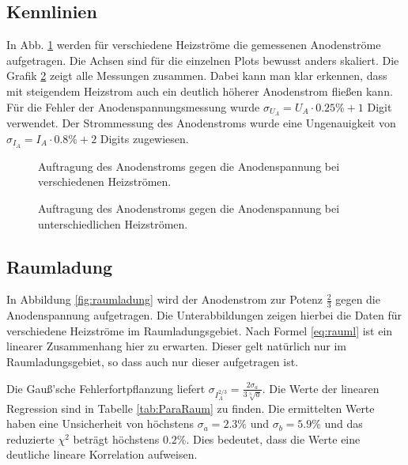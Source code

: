 \documentclass[12pt,a4paper,titlepage,headinclude,bibtotoc]{scrartcl}
\begin{document}
\subsection{Kennlinien}
In Abb. \ref{fig:heiz} werden für verschiedene Heizströme die gemessenen Anodenströme aufgetragen.
Die Achsen sind für die einzelnen Plots bewusst anders skaliert.
Die Grafik \ref{fig:h} zeigt alle Messungen zusammen.
Dabei kann man klar erkennen, dass mit steigendem Heizstrom auch ein deutlich höherer Anodenstrom fließen kann.
Für die Fehler der Anodenspannungsmessung wurde $\sigma_{U_A}=U_A\cdot 0.25\%+1$ Digit verwendet.
Der Strommessung des Anodenstroms wurde eine Ungenauigkeit von $\sigma_{I_A}= I_A\cdot 0.8\%+2$ Digits zugewiesen.
\begin{figure}[h]
  \centering
  \hfill
  \hfill
  \caption{Auftragung des Anodenstroms gegen die Anodenspannung bei verschiedenen Heizströmen.}
  \label{fig:heiz}
\end{figure}
\begin{figure}[!h]
	\centering
	
	\caption{Auftragung des Anodenstroms gegen die Anodenspannung bei unterschiedlichen Heizströmen.}
	\label{fig:h}
\end{figure}


\subsection{Raumladung}
In Abbildung \ref{fig:raumladung} wird der Anodenstrom zur Potenz $\frac{2}{3}$ gegen die Anodenspannung aufgetragen.
Die Unterabbildungen zeigen hierbei die Daten für verschiedene Heizströme im Raumladungsgebiet.
Nach Formel \eqref{eq:rauml} ist ein linearer Zusammenhang hier zu erwarten.
Dieser gelt natürlich nur im Raumladungsgebiet, so dass auch nur dieser aufgetragen ist.

Die Gauß'sche Fehlerfortpflanzung liefert $\sigma_{I_A^{2/3}}=\frac{2\sigma_{a}}{3\sqrt[3]{a}}$.
Die Werte der linearen Regression sind in Tabelle \ref{tab:ParaRaum} zu finden.
Die ermittelten Werte haben eine Unsicherheit von höchstens $\sigma_a = 2.3\%$ und $\sigma_b=5.9\%$ und das reduzierte $\chi^2$ beträgt höchstens $0.2\%$.
Dies bedeutet, dass die Werte eine deutliche lineare Korrelation aufweisen.
\end{document}
